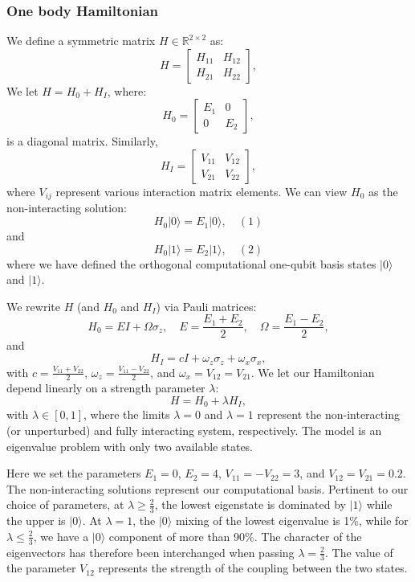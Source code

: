 \documentclass[onecolumn,10pt,cleanfoot]{asme2ej}
\begin{document}
\subsubsection{One body Hamiltonian}
We define a symmetric matrix $H \in \mathbb{R}^{2 \times 2}$ as:
\[
H =
\begin{bmatrix}
H_{11} & H_{12} \\
H_{21} & H_{22}
\end{bmatrix},
\]
We let $H = H_0 + H_I$, where:
\[
H_0 =
\begin{bmatrix}
E_1 & 0 \\
0 & E_2
\end{bmatrix},
\]
is a diagonal matrix. Similarly,
\[
H_I =
\begin{bmatrix}
V_{11} & V_{12} \\
V_{21} & V_{22}
\end{bmatrix},
\]
where $V_{ij}$ represent various interaction matrix elements. We can view $H_0$ as the non-interacting solution:
\[
H_0|0\rangle = E_1|0\rangle, \quad (1)
\]
and
\[
H_0|1\rangle = E_2|1\rangle, \quad (2)
\]
where we have defined the orthogonal computational one-qubit basis states $|0\rangle$ and $|1\rangle$.

We rewrite $H$ (and $H_0$ and $H_I$) via Pauli matrices:
\[
H_0 = E I + \Omega \sigma_z, \quad E = \frac{E_1 + E_2}{2}, \quad \Omega = \frac{E_1 - E_2}{2},
\]
and
\[
H_I = cI + \omega_z \sigma_z + \omega_x \sigma_x,
\]
with $c = \frac{V_{11} + V_{22}}{2}$, $\omega_z = \frac{V_{11} - V_{22}}{2}$, and $\omega_x = V_{12} = V_{21}$. We let our Hamiltonian depend linearly on a strength parameter $\lambda$:
\[
H = H_0 + \lambda H_I,
\]
with $\lambda \in [0, 1]$, where the limits $\lambda = 0$ and $\lambda = 1$ represent the non-interacting (or unperturbed) and fully interacting system, respectively. The model is an eigenvalue problem with only two available states.

Here we set the parameters $E_1 = 0$, $E_2 = 4$, $V_{11} = -V_{22} = 3$, and $V_{12} = V_{21} = 0.2$. The non-interacting solutions represent our computational basis. Pertinent to our choice of parameters, at $\lambda \geq \frac{2}{3}$, the lowest eigenstate is dominated by $|1\rangle$ while the upper is $|0\rangle$. At $\lambda = 1$, the $|0\rangle$ mixing of the lowest eigenvalue is 1\%, while for $\lambda \leq \frac{2}{3}$, we have a $|0\rangle$ component of more than 90\%. The character of the eigenvectors has therefore been interchanged when passing $\lambda = \frac{2}{3}$. The value of the parameter $V_{12}$ represents the strength of the coupling between the two states.
\end{document}
